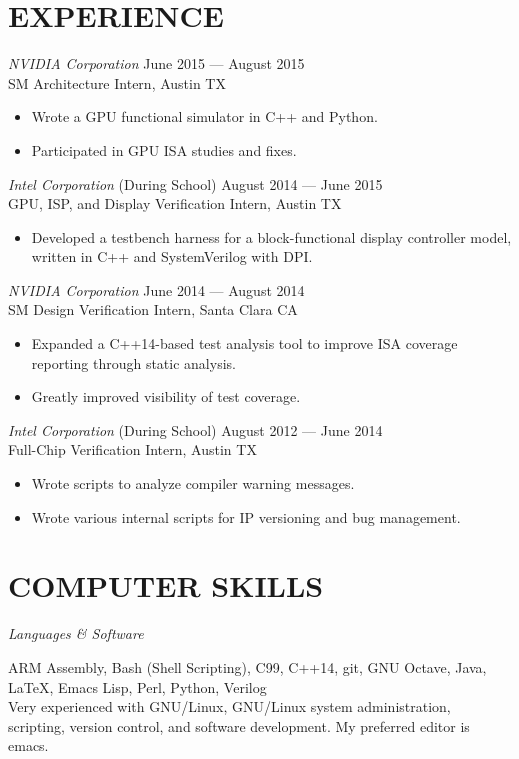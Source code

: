 \documentclass[margin]{res}
\begin{document}
\begin{resume}
  \section{EXPERIENCE}
  {\sl NVIDIA Corporation}
  \hfill June 2015 --- August 2015 \\
  SM Architecture Intern, Austin TX
  \vspace{0.25em}
  \begin{itemize}
  \item Wrote a GPU functional simulator in C++ and Python.
  \item Participated in GPU ISA studies and fixes.
  \end{itemize}
  {\sl Intel Corporation}
  \hfill (During School) August 2014 --- June 2015 \\
  GPU, ISP, and Display Verification Intern, Austin TX
  \vspace{0.25em}
  \begin{itemize}
  \item Developed a testbench harness for a block-functional display
    controller model, written in C++ and SystemVerilog with DPI.
  \end{itemize}
  {\sl NVIDIA Corporation}
  \hfill June 2014 --- August 2014 \\
  SM Design Verification Intern, Santa Clara CA
  \vspace{0.25em}
  \begin{itemize}
  \item Expanded a C++14-based test analysis tool to improve ISA
    coverage reporting through static analysis.
  \item Greatly improved visibility of test coverage.
  \end{itemize}
  {\sl Intel Corporation}
  \hfill (During School) August 2012 --- June 2014 \\
  Full-Chip Verification Intern, Austin TX
  \vspace{0.25em}
  \begin{itemize}
  \item Wrote scripts to analyze compiler warning messages.
  \item Wrote various internal scripts for IP versioning and bug
    management.
  \end{itemize}

  \section{COMPUTER SKILLS}
  {\sl Languages \& Software} \\
  \vspace{-1.0em}
  \begin{adjustwidth}{1.5em}{0pt}
    ARM Assembly, Bash (Shell Scripting), C99, C++14, git, GNU Octave,
    Java, \LaTeX, Emacs Lisp, Perl, Python, Verilog
    \vspace{0.5em} \\
    Very experienced with GNU/Linux, GNU/Linux system administration,
    scripting, version control, and software development. My preferred
    editor is emacs.
  \end{adjustwidth}


\end{resume}
\end{document}

